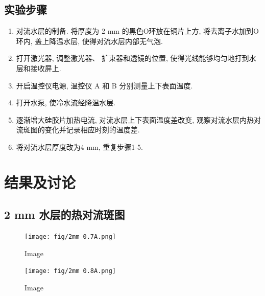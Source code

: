 \documentclass[font=default]{mpltx}
\begin{document}
\subsection{实验步骤}
  \begin{enumerate}
    \item 对流水层的制备. 将厚度为 2 mm 的黑色O环放在铜片上方, 将去离子水加到O环内, 盖上降温水层, 使得对流水层内部无气泡.
    \item 打开激光器, 调整激光器、 扩束器和透镜的位置, 使得光线能够均匀地打到水层和接收屏上.
    \item 开启温控仪电源, 温控仪 A 和 B 分别测量上下表面温度.
    \item 打开水泵, 使冷水流经降温水层.
    \item 逐渐增大硅胶片加热电流, 对流水层上下表面温度差改变, 观察对流水层内热对流斑图的变化并记录相应时刻的温度差.
    \item 将对流水层厚度改为4 mm, 重复步骤1-5.
  \end{enumerate}

\section{结果及讨论}


  \subsection{2 mm 水层的热对流斑图}
  \begin{figure}[h]
      
    \begin{minipage}{0.32\linewidth}
      \vspace{3pt}
      \centerline{\texttt{[image: fig/2mm 0.7A.png]}}
      \centerline{Image}
    \end{minipage}
    \begin{minipage}{0.32\linewidth}
      \vspace{3pt}
      \centerline{\texttt{[image: fig/2mm 0.8A.png]}}
      \vspace{3pt}
  
      \centerline{Image}
    \end{minipage}
  \end{figure}
\end{document}
